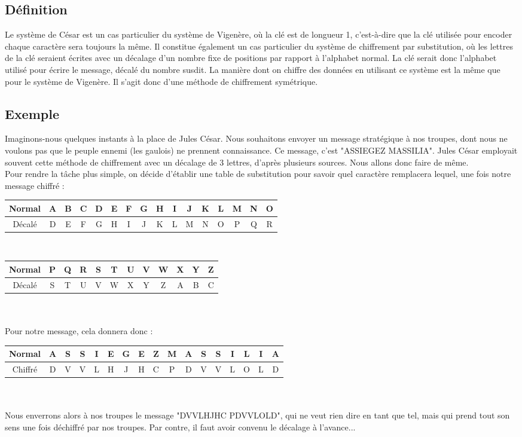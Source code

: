 		\subsection{Définition}
			Le système de César est un cas particulier du système de Vigenère, où la clé est de longueur 1, c'est-à-dire que la clé utilisée pour encoder chaque caractère sera toujours la même. Il constitue également un cas particulier du système de chiffrement par substitution, où les lettres de la clé seraient écrites avec un décalage d'un nombre fixe de positions par rapport à l'alphabet normal. La clé serait donc l'alphabet utilisé pour écrire le message, décalé du nombre susdit.
			La manière dont on chiffre des données en utilisant ce système est la même que pour le système de Vigenère. Il s'agit donc d'une méthode de chiffrement symétrique.
		\subsection{Exemple}
			Imaginons-nous quelques instants à la place de Jules César. Nous souhaitons envoyer un message stratégique à nos troupes, dont nous ne voulons pas que le peuple ennemi (les gaulois) ne prennent connaissance. Ce message, c'est "ASSIEGEZ MASSILIA". Jules César employait souvent cette méthode de chiffrement avec un décalage de 3 lettres, d'après plusieurs sources. Nous allons donc faire de même.\\
			Pour rendre la tâche plus simple, on décide d'établir une table de substitution pour savoir quel caractère remplacera lequel, une fois notre message chiffré :\\
			\begin{tabular}{ | c | c | c | c | c | c | c | c | c | c | c | c | c | c | c | c | }
				\hline
				Normal&A&B&C&D&E&F&G&H&I&J&K&L&M&N&O\\ \hline
				Décalé&D&E&F&G&H&I&J&K&L&M&N&O&P&Q&R\\
				\hline
			\end{tabular}\\
			\begin{tabular}{ | c | c | c | c | c | c | c | c | c | c | c | c | }
				\hline
				Normal&P&Q&R&S&T&U&V&W&X&Y&Z\\ \hline
				Décalé&S&T&U&V&W&X&Y&Z&A&B&C\\
				\hline
			\end{tabular}\\
			\\
			Pour notre message, cela donnera donc :\\
			\begin{tabular}{ | c | c | c | c | c | c | c | c | c | c | c | c | c | c | c | c | c | }
				\hline
				Normal&A&S&S&I&E&G&E&Z&M&A&S&S&I&L&I&A \\ \hline
				Chiffré&D&V&V&L&H&J&H&C&P&D&V&V&L&O&L&D \\
				\hline
			\end{tabular}\\
			\\
			Nous enverrons alors à nos troupes le message "DVVLHJHC PDVVLOLD", qui ne veut rien dire en tant que tel, mais qui prend tout son sens une fois déchiffré par nos troupes. Par contre, il faut avoir convenu le décalage à l'avance...
